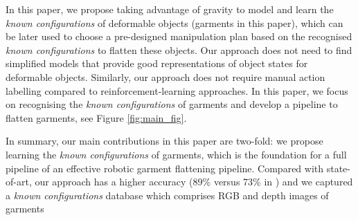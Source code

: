 \documentclass[conference]{IEEEtran}
\begin{document}
In this paper, we propose taking advantage of gravity to model and learn the \textit{known configurations} of deformable objects (garments in this paper), which can be later used to choose a pre-designed manipulation plan based on the recognised \textit{known configurations} to flatten these objects. Our approach does not need to find simplified models that provide good representations of object states for deformable objects. Similarly, our approach does not require manual action labelling compared to reinforcement-learning approaches. In this paper, we focus on recognising the \textit{known configurations} of garments and develop a pipeline to flatten garments, see Figure \ref{fig:main_fig}.


In summary, our main contributions in this paper are two-fold: we propose learning the \textit{known configurations} of garments, which is the foundation for a full pipeline of an effective robotic garment flattening pipeline. Compared with state-of-art, our approach has a higher accuracy (89\% versus 73\% in \cite{8255664,7139370})
and we captured a \textit{known configurations} database which comprises RGB and depth images of garments
\end{document}
